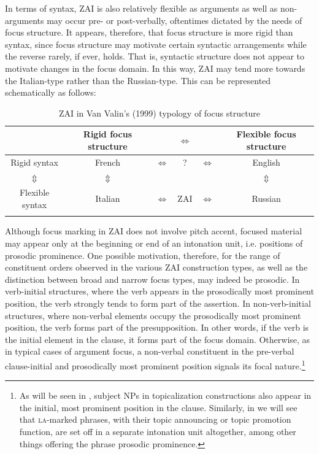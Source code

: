 In terms of syntax, ZAI is also relatively flexible as arguments as well as non-arguments may occur pre- or post-verbally, oftentimes dictated by the needs of focus structure. It appears, therefore, that focus structure is more rigid than syntax, since focus structure may motivate certain syntactic arrangements while the reverse rarely, if ever, holds. That is, syntactic structure does not appear to motivate changes in the focus domain. In this way, ZAI may tend more towards the Italian-type rather than the Russian-type. This can be represented schematically as follows:

\begin{table}

\caption{{ZAI in Van Valin's (1999) typology of focus structure}}\label{zapfoctyp}
\begin{tabular}{c@{}c@{}c c c@{}c}
\lsptoprule
& Rigid focus structure & & $\Leftrightarrow$ & & Flexible focus structure  \\

\midrule
Rigid syntax & French & $\Leftrightarrow$ & ? & $\Leftrightarrow$ & English \\
$\Updownarrow$ &  $\Updownarrow$ & & & & $\Updownarrow$ \\
Flexible syntax & Italian & $\Leftrightarrow$ & ZAI & $\Leftrightarrow$ & Russian \\

\lspbottomrule
\end{tabular}

\end{table}

Although focus marking in ZAI does not involve pitch accent, focused material may appear only at the beginning or end of an intonation unit, i.e. positions of prosodic prominence. One possible motivation, therefore, for the range of constituent orders observed in the various ZAI construction types, as well as the distinction between broad and narrow focus types, may indeed be prosodic. In verb-initial structures, where the verb appears in the prosodically most prominent position, the verb strongly tends to form part of the assertion. In non-verb-initial structures, where non-verbal elements occupy the prosodically most prominent position, the verb forms part of the presupposition. In other words, if the verb is the initial element in the clause, it forms part of the focus domain. Otherwise, as in typical cases of argument focus, a non-verbal constituent in the pre-verbal clause-initial and prosodically most prominent position signals its focal nature.\footnote{As will be seen in , subject NPs in topicalization constructions also appear in the initial, most prominent position in the clause. Similarly, in  we will see that \textsc{la}-marked phrases, with their topic announcing or topic promotion function, are set off in a separate intonation unit altogether, among other things offering the phrase prosodic prominence.} 



